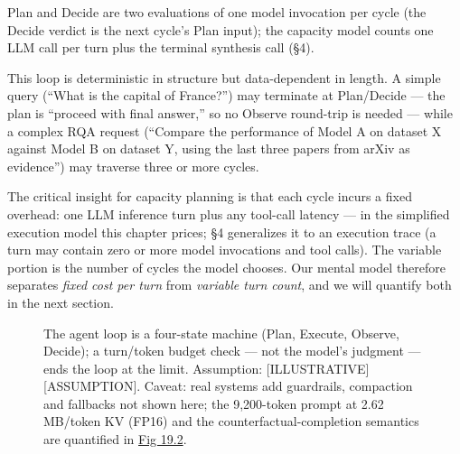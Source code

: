 Plan and Decide are two evaluations of one model invocation per cycle
(the Decide verdict is the next cycle's Plan input); the capacity model
counts one LLM call per turn plus the terminal synthesis call (§4).

This loop is deterministic in structure but data-dependent in length. A
simple query (``What is the capital of France?'') may terminate at
Plan/Decide --- the plan is ``proceed with final answer,'' so no Observe
round-trip is needed --- while a complex RQA request (``Compare the
performance of Model A on dataset X against Model B on dataset Y, using
the last three papers from arXiv as evidence'') may traverse three or
more cycles.

The critical insight for capacity planning is that each cycle incurs a
fixed overhead: one LLM inference turn plus any tool-call latency --- in
the simplified execution model this chapter prices; §4 generalizes it to
an execution trace (a turn may contain zero or more model invocations
and tool calls). The variable portion is the number of cycles the model
chooses. Our mental model therefore separates \emph{fixed cost per turn}
from \emph{variable turn count}, and we will quantify both in the next
section.

\begin{figure}
\centering
{}
\caption[The agent loop is a four-state machine (Plan, Execute, Observe, Decide)]{The agent loop is a four-state machine (Plan, Execute, Observe, Decide); a turn/token budget check --- not the model's judgment --- ends the loop at the limit. Assumption: \mbox{{[}ILLUSTRATIVE{]}}\hspace{0pt}\mbox{{[}ASSUMPTION{]}}. Caveat: real systems add guardrails, compaction and fallbacks not shown here; the 9,200-token prompt at 2.62 MB/token KV (FP16) and the counterfactual-completion semantics are quantified in \hyperref[fig:19.2]{Fig 19.2}.}

\label{fig:19.1}\end{figure}

